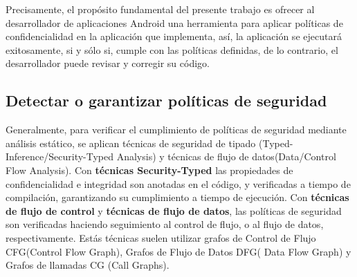 Precisamente, el propósito fundamental del presente trabajo es ofrecer al
desarrollador de aplicaciones Android una herramienta para aplicar políticas de
confidencialidad en la aplicación que implementa, así, la aplicación se
ejecutará exitosamente, si y sólo si, cumple con las políticas definidas, de lo
contrario, el desarrollador puede revisar y corregir su código.\newline
 
\subsection{Detectar o garantizar políticas de seguridad } 
Generalmente, para verificar el cumplimiento de políticas de seguridad mediante
análisis estático, se aplican técnicas de seguridad de tipado
(Typed-Inference/Security-Typed Analysis) y técnicas de flujo de
datos(Data/Control Flow Analysis)\cite{Information-Flow-Java}.\newline 
Con \textbf{técnicas Security-Typed} las propiedades de confidencialidad e
integridad son anotadas en el código, y verificadas a tiempo de compilación,
garantizando su cumplimiento a tiempo de ejecución.\newline 
Con \textbf{técnicas de flujo de control} y \textbf{técnicas de flujo de datos},
las políticas de seguridad son verificadas haciendo seguimiento al control de
flujo, o al flujo de datos, respectivamente. Estás técnicas suelen utilizar
grafos de Control de Flujo CFG(Control Flow Graph), Grafos de Flujo de Datos
DFG( Data Flow Graph) y Grafos de llamadas CG (Call Graphs).

